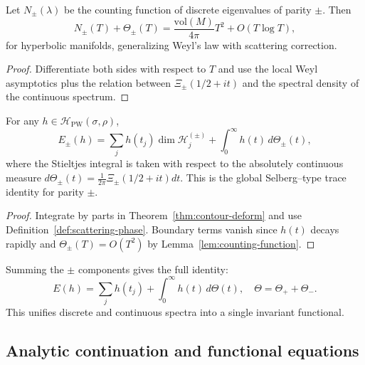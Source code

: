 \begin{lemma}
\label{lem:counting-function}
Let $N_\pm(\lambda)$ be the counting function of discrete eigenvalues of parity $\pm$.  
Then
\[
N_\pm(T)+\Theta_\pm(T)
=\frac{\mathrm{vol}(M)}{4\pi}T^2+O(T\log T),
\]
for hyperbolic manifolds, generalizing Weyl’s law with scattering correction. %
\end{lemma}

\begin{proof}
Differentiate both sides with respect to $T$ and use the local Weyl asymptotics plus the relation between $\Xi_\pm(1/2+it)$ and the spectral density of the continuous spectrum. %
\end{proof}

\begin{theorem}
\label{thm:global-trace-identity}
For any $h\in\mathcal{H}_{\mathrm{PW}}(\sigma,\rho)$,
\[
E_\pm(h)
=\sum_j h(t_j)\dim\mathcal{H}_j^{(\pm)}
+\int_0^\infty h(t)\,d\Theta_\pm(t),
\]
where the Stieltjes integral is taken with respect to the absolutely continuous measure $d\Theta_\pm(t)=\frac{1}{2\pi}\Xi_\pm(1/2+it)dt$.  
This is the global Selberg–type trace identity for parity $\pm$. %
\end{theorem}

\begin{proof}
Integrate by parts in Theorem~\ref{thm:contour-deform} and use Definition~\ref{def:scattering-phase}.  
Boundary terms vanish since $h(t)$ decays rapidly and $\Theta_\pm(T)=O(T^2)$ by Lemma~\ref{lem:counting-function}. %
\end{proof}

\begin{remark}
\label{rem:unified-form}
Summing the $\pm$ components gives the full identity:
\[
E(h)
=\sum_j h(t_j)
+\int_0^\infty h(t)\,d\Theta(t),
\quad \Theta=\Theta_++\Theta_-.
\]
This unifies discrete and continuous spectra into a single invariant functional. %
\end{remark}

\subsection{Analytic continuation and functional equations}
\label{subsec:ch6-part4-analytic} \relax

